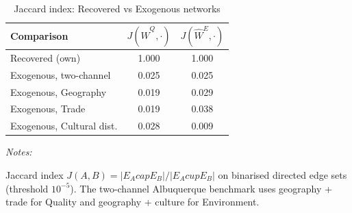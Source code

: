\begin{table}[!h]
\centering
\caption{\label{tab:tab:jaccard}Jaccard index: Recovered vs Exogenous networks}
\centering
\fontsize{10}{12}\selectfont
\begin{threeparttable}
\begin{tabular}[t]{lcc}
\toprule
Comparison & $J(\hat W^Q, \cdot)$ & $J(\hat W^E, \cdot)$\\
\midrule
Recovered (own) & 1.000 & 1.000\\
Exogenous, two-channel & 0.025 & 0.025\\
Exogenous, Geography & 0.019 & 0.029\\
Exogenous, Trade & 0.019 & 0.038\\
Exogenous, Cultural dist. & 0.028 & 0.009\\
\bottomrule
\end{tabular}
\begin{tablenotes}[para]
\item \textit{Notes:} 
\item Jaccard index $J(A,B)=|E_Acap E_B|/|E_Acup E_B|$ on binarised directed edge sets (threshold $10^{-5}$). The two-channel Albuquerque benchmark uses geography + trade for Quality and geography + culture for Environment.
\end{tablenotes}
\end{threeparttable}
\end{table}
